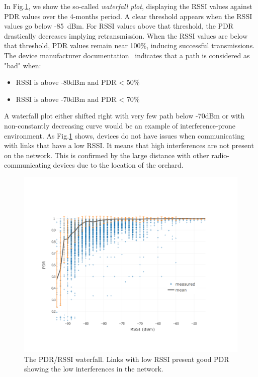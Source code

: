 \documentclass{sig-alternate}
\begin{document}

In Fig.\ref{fig:waterfall}, we show the so-called \textit{waterfall plot}, displaying the RSSI values against PDR values over the 4-months period.
A clear threshold appears when the RSSI values go below -85~dBm.
For RSSI values above that threshold, the PDR drastically decreases implying retransmission.
When the RSSI values are below that threshold, PDR values remain near 100\%, inducing successful transmissions.
The device manufacturer documentation~\cite{smip_app_note} indicates that a path is considered as "bad" when:

\begin{itemize}
  \item RSSI is above -80dBm and PDR < 50\%
  \item RSSI is above -70dBm and PDR < 70\%
\end{itemize}


A waterfall plot either shifted right with very few path below -70dBm or with non-constantly decreasing curve would be an example of interference-prone environment.
As Fig.\ref{fig:waterfall} shows, devices do not have issues when communicating with links that have a low RSSI.
It means that high interferences are not present on the network.
This is confirmed by the large distance with other radio-communicating devices due to the location of the orchard.

\begin{figure}
    \centering
    \includegraphics[width=\columnwidth]{waterfall}
    \caption{
        The PDR/RSSI waterfall.
        Links with low RSSI present good PDR showing the low interferences in the network.
    }
    \label{fig:waterfall}
\end{figure}
\end{document}
